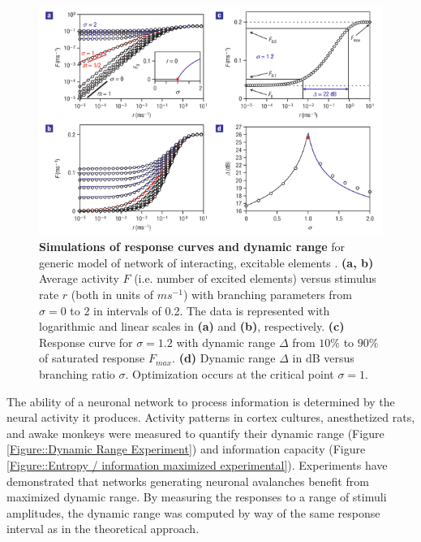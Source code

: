 \documentclass[12pt]{article}
\begin{document}
\begin{figure}      
  \begin{center}    
 \includegraphics[width=1\textwidth]{dynamicrangetheorycopelli}    
    \caption{\textbf{Simulations of response curves and dynamic range} for generic model of network of interacting, excitable elements \cite{Kinouchi2006b}. \textbf{(a, b)} Average activity $F$ (i.e. number of excited elements) versus stimulus rate $r$ (both in units of $ms^{-1}$) with branching parameters from $\sigma = 0$ to 2 in intervals of 0.2. The data is represented with logarithmic and linear scales in \textbf{(a)} and \textbf{(b)}, respectively. \textbf{(c)} Response curve for $\sigma = 1.2$ with dynamic range $\Delta$ from $10\%$ to $90\%$ of saturated response $F_{max}$. \textbf{(d)} Dynamic range $\Delta$ in dB versus branching ratio $\sigma$. Optimization occurs at the critical point $\sigma = 1$.}
   \label{Figure::Dynamic Range Theory}   
  \end{center}     
   \end{figure}

The ability of a neuronal network to process information is determined by the neural activity it produces. Activity patterns in cortex cultures, anesthetized rats, and awake monkeys were measured to quantify their dynamic range (Figure \ref{Figure::Dynamic Range Experiment}) and information capacity (Figure \ref{Figure::Entropy / information maximized experimental}). Experiments have demonstrated that networks generating neuronal avalanches benefit from maximized dynamic range\cite{Shew2009b}. By measuring the responses to a range of stimuli amplitudes, the dynamic range was computed by way of the same response interval as in the theoretical approach.
   
\end{document}
